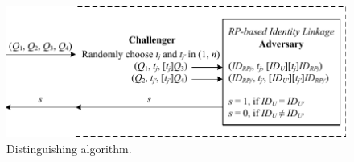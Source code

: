 \begin{figure}[t]
  \centering
  \includegraphics[width=1\linewidth]{fig/dalgorithm.pdf}
  \vspace{-5mm}
  \caption{Distinguishing algorithm.}
  \label{fig:dalgorithm}
  \vspace{-5mm}
\end{figure}

